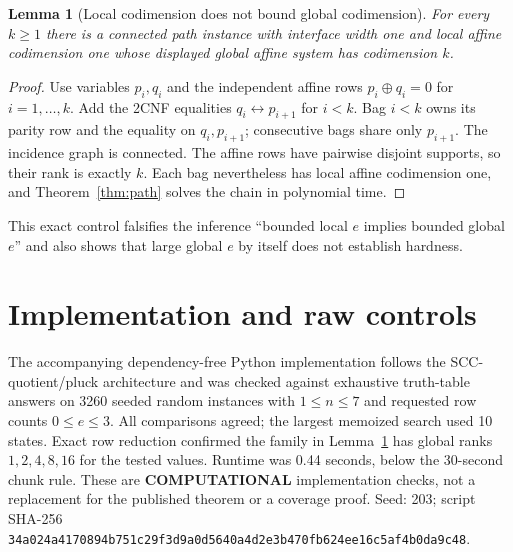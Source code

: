 \documentclass[10pt]{article}
\newtheorem{lemma}{Lemma}
\begin{document}
\begin{lemma}[Local codimension does not bound global codimension]\label{lem:rank}
For every $k\ge1$ there is a connected path instance with interface width one and local affine
codimension one whose displayed global affine system has codimension $k$.
\end{lemma}
\begin{proof}
Use variables $p_i,q_i$ and the independent affine rows $p_i\oplus q_i=0$ for
$i=1,\dots,k$.  Add the 2CNF equalities $q_i\leftrightarrow p_{i+1}$ for $i<k$.
Bag $i<k$ owns its parity row and the equality on $q_i,p_{i+1}$; consecutive bags share only
$p_{i+1}$.  The incidence graph is connected.  The affine rows have pairwise disjoint supports,
so their rank is exactly $k$.  Each bag nevertheless has local affine codimension one, and
Theorem~\ref{thm:path} solves the chain in polynomial time.
\end{proof}
This exact control falsifies the inference ``bounded local $e$ implies bounded global $e$'' and
also shows that large global $e$ by itself does not establish hardness.

\section{Implementation and raw controls}
The accompanying dependency-free Python implementation follows the SCC-quotient/pluck
architecture and was checked against exhaustive truth-table answers on 3260 seeded random
instances with $1\le n\le7$ and requested row counts $0\le e\le3$.  All comparisons agreed;
the largest memoized search used 10 states.  Exact row reduction confirmed the family in
Lemma~\ref{lem:rank} has global ranks $1,2,4,8,16$ for the tested values.  Runtime was
0.44 seconds, below the 30-second chunk rule.  These are \textbf{COMPUTATIONAL} implementation
checks, not a replacement for the published theorem or a coverage proof.  Seed: 203; script
SHA-256 \texttt{34a024a4170894b751c29f3d9a0d5640a4d2e3b470fb624ee16c5af4b0da9c48}.
\end{document}
